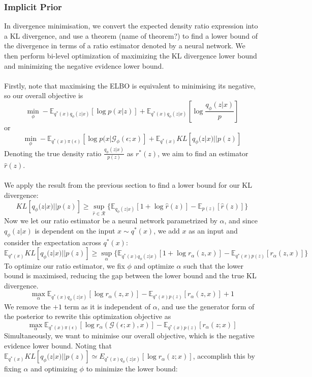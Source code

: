 \documentclass[a4paper,12pt]{article}
\numberwithin{equation}{section}
\begin{document}
\subsubsection{Implicit Prior}
In divergence minimisation, we convert the expected density ratio expression into a KL divergence, and use a theorem (name of theorem?) to find a lower bound of the divergence in terms of a ratio estimator denoted by a neural network. We then perform bi-level optimization of maximizing the KL divergence lower bound and minimizing the negative evidence lower bound.\\
\\
Firstly, note that maximising the ELBO is equivalent to minimising its negative, so our overall objective is
\[\min_\phi -\mathbb{E}_{q^*(x)q_\phi(z|x)}\left[\log p(x|z)\right]+\mathbb{E}_{q^*(x)q_\phi(z|x)}\left[\log \frac{q_\phi(z|x)}{p}\right]\]
or
\[\min_\phi -\mathbb{E}_{q^*(x)\pi(\epsilon)}\left[\log p(x|\mathcal{G}_\phi(\epsilon;x)\right]+\mathbb{E}_{q^*(x)}KL[q_\phi(z|x)||p(z)]\]
Denoting the true density ratio $\frac{q_\phi(z|x)}{p(z)}$ as $r^*(z)$, we aim to find an estimator $\hat{r}(z)$.\\ 
\\
We apply the result from the previous section to find a lower bound for our KL divergence:
\[KL[q_\phi(z|x)||p(z)]\geq \sup_{\hat{r}\in \mathcal{R}}\{\mathbb{E}_{q_\phi(z|x)}[1+\log \hat{r}(z)]-\mathbb{E}_{p(z)}[\hat{r}(z)]\}\]
Now we let our ratio estimator be a neural network parametrized by $\alpha$, and since $q_\phi(z|x)$ is dependent on the input $x\sim q^*(x)$, we add $x$ as an input and consider the expectation across $q^*(x)$:
\[\mathbb{E}_{q^*(x)}KL[q_\phi(z|x)||p(z)]\geq \sup_\alpha \{\mathbb{E}_{q^*(x)q_\phi(z|x)}[1+\log r_\alpha(z,x)]-\mathbb{E}_{q^*(x)p(z)}[r_\alpha (z,x)]\}\]
To optimize our ratio estimator, we fix $\phi$ and optimize $\alpha$ such that the lower bound is maximised, reducing the gap between the lower bound and the true KL divergence.
\[\max_\alpha \mathbb{E}_{q^*(x)q_\phi(z|x)}[\log r_\alpha(z,x)]-\mathbb{E}_{q^*(x)p(z)}[r_\alpha(z,x)]+1\]
We remove the $+1$ term as it is independent of $\alpha$, and use the generator form of the posterior to rewrite this optimization objective as
\[\max_\alpha \mathbb{E}_{q^*(x)\pi(\epsilon)}[\log r_\alpha(\mathcal{G}(\epsilon;x),x)]-\mathbb{E}_{q^*(x)p(z)}[r_\alpha(z;x)]\]
Simultaneously, we want to minimise our overall objective, which is the negative evidence lower bound. Noting that $\mathbb{E}_{q^*(x)}KL[q_\phi(z|x)||p(z)]\simeq E_{q^*(x)q_\phi (z|x)}[\log r_\alpha(z;x)]$, accomplish this by fixing $\alpha$ and optimizing $\phi$ to minimize the lower bound:
\end{document}
